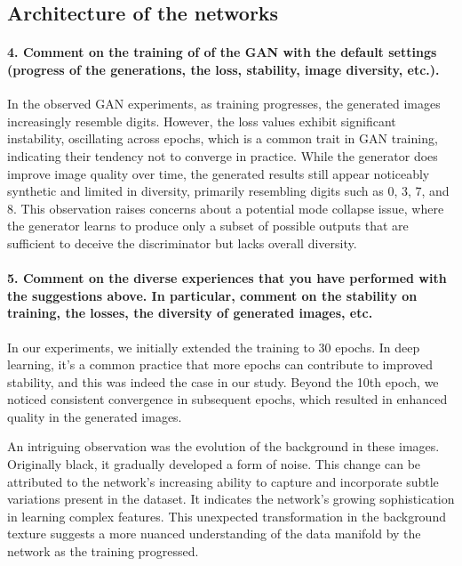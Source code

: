 \subsection{Architecture of the networks}

\paragraph*{4. Comment on the training of of the GAN with the default settings (progress of the generations, the loss, stability, image diversity, etc.).}

In the observed GAN experiments, as training progresses, the generated images increasingly resemble digits. However, the loss values exhibit significant instability, oscillating across epochs, which is a common trait in GAN training, indicating their tendency not to converge in practice. While the generator does improve image quality over time, the generated results still appear noticeably synthetic and limited in diversity, primarily resembling digits such as 0, 3, 7, and 8. This observation raises concerns about a potential mode collapse issue, where the generator learns to produce only a subset of possible outputs that are sufficient to deceive the discriminator but lacks overall diversity.


\paragraph*{5. Comment on the diverse experiences that you have performed with the suggestions above. In particular, comment on the stability on training, the losses, the diversity of generated images, etc.}

In our experiments, we initially extended the training to 30 epochs. In deep learning, it's a common practice that more epochs can contribute to improved stability, and this was indeed the case in our study. Beyond the 10th epoch, we noticed consistent convergence in subsequent epochs, which resulted in enhanced quality in the generated images.

An intriguing observation was the evolution of the background in these images. Originally black, it gradually developed a form of noise. This change can be attributed to the network's increasing ability to capture and incorporate subtle variations present in the dataset. It indicates the network's growing sophistication in learning complex features. This unexpected transformation in the background texture suggests a more nuanced understanding of the data manifold by the network as the training progressed.

